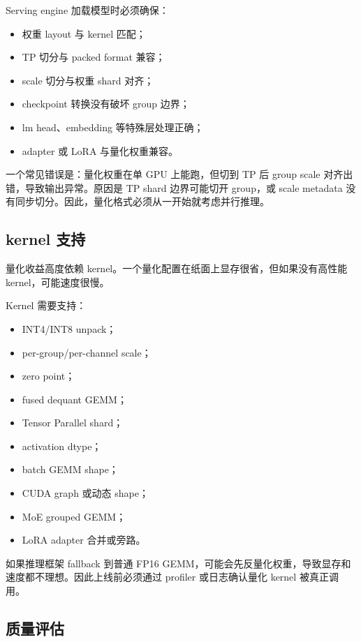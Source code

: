 Serving engine 加载模型时必须确保：

\begin{itemize}
\item 权重 layout 与 kernel 匹配；
\item TP 切分与 packed format 兼容；
\item scale 切分与权重 shard 对齐；
\item checkpoint 转换没有破坏 group 边界；
\item lm head、embedding 等特殊层处理正确；
\item adapter 或 LoRA 与量化权重兼容。
\end{itemize}

一个常见错误是：量化权重在单 GPU 上能跑，但切到 TP 后 group scale 对齐出错，导致输出异常。原因是 TP shard 边界可能切开 group，或 scale metadata 没有同步切分。因此，量化格式必须从一开始就考虑并行推理。

\subsection{kernel 支持}
\label{subsec:quantized-kernel-support}

量化收益高度依赖 kernel。一个量化配置在纸面上显存很省，但如果没有高性能 kernel，可能速度很慢。

Kernel 需要支持：

\begin{itemize}
\item INT4/INT8 unpack；
\item per-group/per-channel scale；
\item zero point；
\item fused dequant GEMM；
\item Tensor Parallel shard；
\item activation dtype；
\item batch GEMM shape；
\item CUDA graph 或动态 shape；
\item MoE grouped GEMM；
\item LoRA adapter 合并或旁路。
\end{itemize}

如果推理框架 fallback 到普通 FP16 GEMM，可能会先反量化权重，导致显存和速度都不理想。因此上线前必须通过 profiler 或日志确认量化 kernel 被真正调用。

\subsection{质量评估}
\label{subsec:quantization-quality-evaluation}

